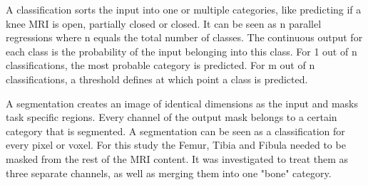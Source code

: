 A classification sorts the input into one or multiple categories, like predicting if a knee MRI is open, partially closed or closed. It can be seen as n parallel regressions where n equals the total number of classes. The continuous output for each class is the probability of the input belonging into this class. For 1 out of n classifications, the most probable category is predicted. For m out of n classifications, a threshold defines at which point a class is predicted.

A segmentation creates an image of identical dimensions as the input and masks task specific regions. Every channel of the output mask belongs to a certain category that is segmented. A segmentation can be seen as a classification for every pixel or voxel. For this study the Femur, Tibia and Fibula needed to be masked from the rest of the MRI content. It was investigated to treat them as three separate channels, as well as merging them into one "bone" category.

\newpage